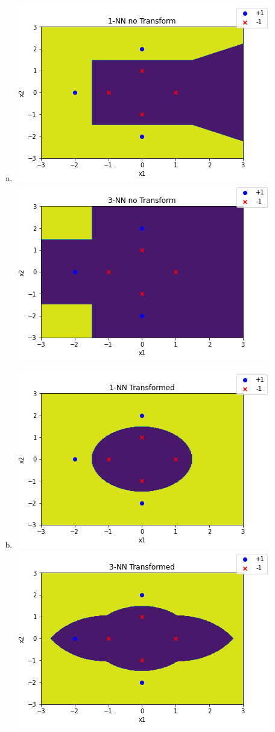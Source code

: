 \documentclass{article}
\begin{document}
\begin{enumerate}[a)]
    \item \includegraphics[]{1/1} \\ \includegraphics[]{1/2}
    \item \includegraphics[]{1/3} \\ \includegraphics[]{1/4}
\end{enumerate}
\end{document}
